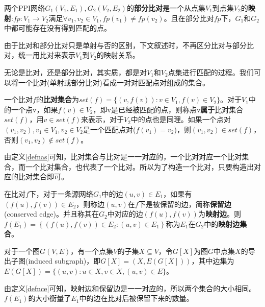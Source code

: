 \begin{defn}[部分比对]
\label{defnpa}
两个PPI网络$G_1(V_1,E_1),G_2(V_2,E_2)$的\textbf{部分比对}是一个从点集$V_1$到点集$V_2$的\textbf{映射}:$fp:V_1\rightarrow V_2$满足$\forall v_1,v_2\in V_1,fp(v_1)\neq fp(v_2)$。且在部分比对$fp$下，$G_1$和$G_2$中都可能存在没有得到匹配的点。
\end{defn}

由于比对和部分比对只是单射与否的区别，下文叙述时，不再区分比对与部分比对，统一用比对来表示$V_1$到$V_2$的映射关系。

无论是比对，还是部分比对，其实质，都是对$V_1$和$V_2$点集进行匹配的过程。我们可以将一个比对(单射或部分比对)看成一对对匹配点对组成的集合。

\begin{defn}[比对集合]
\label{defnas}
一个比对$f$的\textbf{比对集合}为$set(f)=\{(v,f(v)):v\in V_1,f(v)\in V_2\}$。对于$V_1$中的一个点v，如果$f(v)\in V_2$，即v是已经被匹配的点，则称点v\textbf{属于}比对集合$set(f)$，用$v\in set(f)$来表示，对于$V_2$中的点也是同理。如果一个点对$(v_1,v_2),v_1\in V_1,v_2\in V_2$是一个匹配点对($f(v_1)=v_2$)，则$(v_1,v_2)\in set(f)$，否则$(v_1,v_2)\notin set(f)$。
\end{defn}

由定义\ref{defnas}可知，比对集合与比对是一一对应的，一个比对对应一个比对集合，而一个比对集合，也代表了一个比对。所以为了构造一个比对，只要构造出对应的比对集合即可。

\begin{defn}
\label{defnce}
在比对$f$下，对于一条源网络$G_1$中的边$(u,v)\in E_1$，如果有$(f(u),f(v))\in E_2$，则称边$(u,v)$在$f$下是被保留的边，简称\textbf{保留边}(conserved edge)。并且称其在$G_2$中对应的边$(f(u),f(v))$为\textbf{映射边}。则$f(E_1)=\left \{(f(u),f(v))\in E_2:(u,v)\in E_1\right \}$称为$E_1$在$G_2$中的\textbf{映射边集合}。
\end{defn}

\begin{defn}
对于一个图$G(V,E)$，有一个点集$V$的子集$X\subseteq V$，令$G[X]$为图$G$中点集$X$的导出子图(induced subgraph)，即$G[X]=(X,E(G[X]))$，其中边集为$E(G[X])=\{(u,v):u\in X,v\in X,(u,v)\in E\}$。
\end{defn}

由定义\ref{defnce}可知，映射边和保留边是一一对应的，所以两个集合的大小相同。$f(E_1)$的大小衡量了$E_1$中的边在比对后被保留下来的数量。

